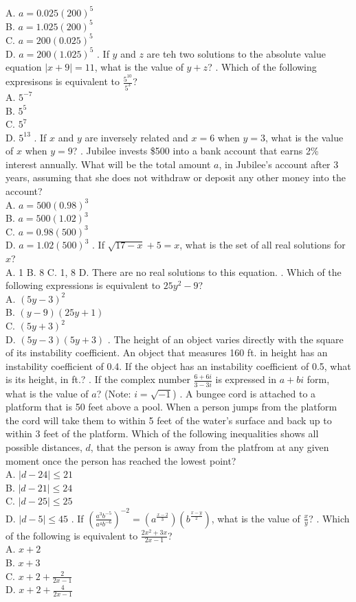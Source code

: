 \documentclass[../satmath.tex]{subfiles}
\begin{document}
\begin{enumerate}[label=\bfseries\arabic*.]
A. $a=0.025(200)^5$\\
B. $a=1.025(200)^5$\\
C. $a=200(0.025)^5$\\
D. $a=200(1.025)^5$
. If $y$ and $z$ are teh two solutions to the absolute value equation $|x+9|=11$, what is the value of $y+z$?
. Which of the following expresisons is equivalent to $\frac{5^{10}}{5^3}$?\\
A. $5^{-7}$\\
B. $5^5$\\
C. $5^7$\\
D. $5^{13}$
. If $x$ and $y$ are inversely related and $x=6$ when $y=3$, what is the value of $x$ when $y=9$?
. Jubilee invests \$500 into a bank account that earns 2\% interest annually. What will be the total amount $a$, in Jubilee's account after 3 years, 
assuming that she does not withdraw or deposit any other money into the account?\\
A. $a=500(0.98)^3$\\
B. $a=500(1.02)^3$\\
C. $a=0.98(500)^3$\\
D. $a=1.02(500)^3$
. If $\sqrt{17-x}+5=x$, what is the set of all real solutions for $x$?\\
A. {1} \quad B. {8} \quad C. {1, 8} \quad D. There are no real solutions to this equation.
. Which of the following expressions is equivalent to $25y^2-9$?\\
A. $(5y-3)^2$\\
B. $(y-9)(25y+1)$\\
C. $(5y+3)^2$\\
D. $(5y-3)(5y+3)$
. The height of an object varies directly with the square of its instability coefficient. An object that measures 160 ft. in height has an 
instability coefficient of 0.4. If the object has an instability coefficient of 0.5, what is its height, in ft.?
. If the complex number $\frac{6+6i}{3-3i}$ is expressed in $a+bi$ form, what is the value of $a$? (Note: $i=\sqrt{-1}$)
. A bungee cord is attached to a platform that is 50 feet above a pool. When a person jumps from the platform the cord will take them to within 
5 feet of the water's surface and back up to within 3 feet of the platform. Which of the following inequalities shows all possible distances, $d$, 
that the person is away from the platfrom at any given moment once the person has reached the lowest point?\\
A. $|d-24|\leq 21$\\
B. $|d-21|\leq 24$\\
C. $|d-25|\leq 25$\\
D. $|d-5|\leq 45$
. If $\left(\frac{a^3b^{-5}}{a^4b^{-6}}\right)^{-2}=\left(a^{\frac{x-2}{3}}\right)\left(b^{\frac{x-y}{2}}\right)$, what is the value of $\frac{x}{y}$?
. Which of the following is equivalent to $\frac{2x^2+3x}{2x-1}$?\\
A. $x+2$\\
B. $x+3$\\
C. $x+2+\frac{2}{2x-1}$\\
D. $x+2+\frac{4}{2x-1}$


\end{enumerate}
\end{document}
